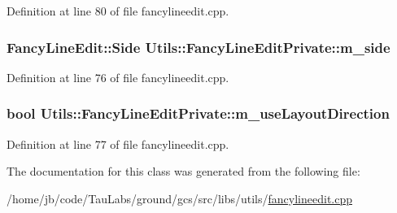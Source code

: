\-Definition at line 80 of file fancylineedit.\-cpp.

\hypertarget{class_utils_1_1_fancy_line_edit_private_ad60d06ba3fb014847644f73c494245b0}{
\subsubsection[{m\-\_\-side}]{\setlength{\rightskip}{0pt plus 5cm}\-Fancy\-Line\-Edit\-::\-Side {\bf \-Utils\-::\-Fancy\-Line\-Edit\-Private\-::m\-\_\-side}}}\label{class_utils_1_1_fancy_line_edit_private_ad60d06ba3fb014847644f73c494245b0}


\-Definition at line 76 of file fancylineedit.\-cpp.

\hypertarget{class_utils_1_1_fancy_line_edit_private_a54c91966247b6fded6bf5740e658e9ea}{
\subsubsection[{m\-\_\-use\-Layout\-Direction}]{\setlength{\rightskip}{0pt plus 5cm}bool {\bf \-Utils\-::\-Fancy\-Line\-Edit\-Private\-::m\-\_\-use\-Layout\-Direction}}}\label{class_utils_1_1_fancy_line_edit_private_a54c91966247b6fded6bf5740e658e9ea}


\-Definition at line 77 of file fancylineedit.\-cpp.



\-The documentation for this class was generated from the following file\-:\begin{DoxyCompactItemize}
\item 
/home/jb/code/\-Tau\-Labs/ground/gcs/src/libs/utils/\hyperlink{fancylineedit_8cpp}{fancylineedit.\-cpp}\end{DoxyCompactItemize}
